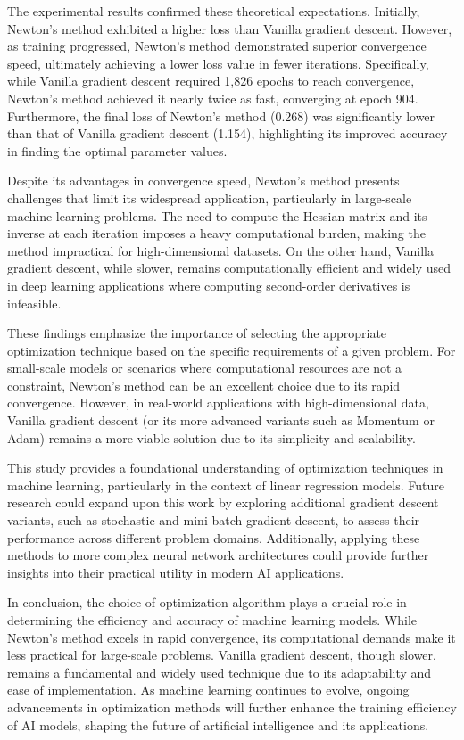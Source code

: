 \documentclass[12pt]{article}
\theoremstyle{definition}
\begin{document}
The experimental results confirmed these theoretical expectations. Initially, Newton’s method exhibited a higher loss than Vanilla gradient descent. However, as training progressed, Newton’s method demonstrated superior convergence speed, ultimately achieving a lower loss value in fewer iterations. Specifically, while Vanilla gradient descent required 1,826 epochs to reach convergence, Newton’s method achieved it nearly twice as fast, converging at epoch 904. Furthermore, the final loss of Newton’s method (0.268) was significantly lower than that of Vanilla gradient descent (1.154), highlighting its improved accuracy in finding the optimal parameter values.

Despite its advantages in convergence speed, Newton’s method presents challenges that limit its widespread application, particularly in large-scale machine learning problems. The need to compute the Hessian matrix and its inverse at each iteration imposes a heavy computational burden, making the method impractical for high-dimensional datasets. On the other hand, Vanilla gradient descent, while slower, remains computationally efficient and widely used in deep learning applications where computing second-order derivatives is infeasible. 

These findings emphasize the importance of selecting the appropriate optimization technique based on the specific requirements of a given problem. For small-scale models or scenarios where computational resources are not a constraint, Newton’s method can be an excellent choice due to its rapid convergence. However, in real-world applications with high-dimensional data, Vanilla gradient descent (or its more advanced variants such as Momentum or Adam) remains a more viable solution due to its simplicity and scalability.

This study provides a foundational understanding of optimization techniques in machine learning, particularly in the context of linear regression models. Future research could expand upon this work by exploring additional gradient descent variants, such as stochastic and mini-batch gradient descent, to assess their performance across different problem domains. Additionally, applying these methods to more complex neural network architectures could provide further insights into their practical utility in modern AI applications.

In conclusion, the choice of optimization algorithm plays a crucial role in determining the efficiency and accuracy of machine learning models. While Newton’s method excels in rapid convergence, its computational demands make it less practical for large-scale problems. Vanilla gradient descent, though slower, remains a fundamental and widely used technique due to its adaptability and ease of implementation. As machine learning continues to evolve, ongoing advancements in optimization methods will further enhance the training efficiency of AI models, shaping the future of artificial intelligence and its applications.
\end{document}
